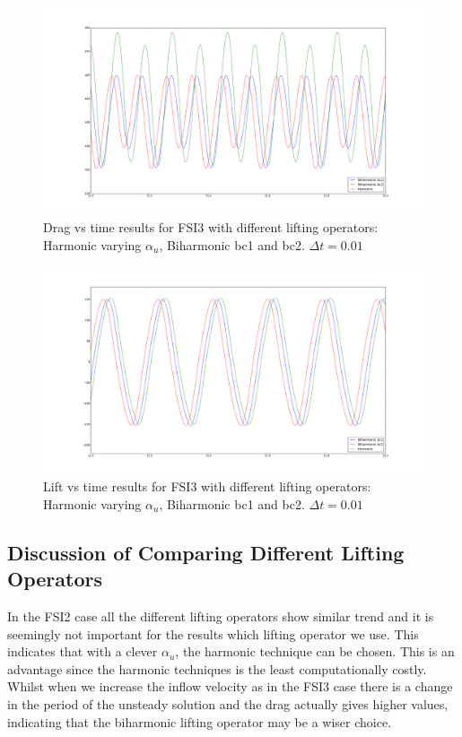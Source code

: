 \begin{figure}[H]
    \centering
    \includegraphics[trim={3cm 3cm 3cm 3cm},scale=0.20]{./Mesh_motion_results/FSI3_dt0001_Drag.png} 
    \caption{Drag vs time results for FSI3 with different lifting operators: Harmonic varying $\alpha_u$, Biharmonic bc1 and bc2. $\Delta t = 0.01$}
    \label{FSI33}
\end{figure}
\begin{figure}[H]
    \centering
    \includegraphics[trim={3cm 3cm 3cm 3cm},scale=0.20]{./Mesh_motion_results/FSI3_dt0001_Lift.png} 
    \caption{Lift vs time results for FSI3 with different lifting operators: Harmonic varying $\alpha_u$, Biharmonic bc1 and bc2. $\Delta t = 0.01$}
    \label{FSI34}
\end{figure}

\subsection*{Discussion of Comparing Different Lifting Operators}
In the FSI2 case all the different lifting operators show similar trend and it is seemingly not important for the results which lifting operator we use. This indicates that with a clever $\alpha_u$, the harmonic technique can be chosen. This is an advantage since the harmonic techniques is the least computationally costly. Whilst when we increase the inflow velocity as in the FSI3 case there is a change in the period of the unsteady solution and the drag actually gives higher values, indicating that the biharmonic lifting operator may be a wiser choice.

